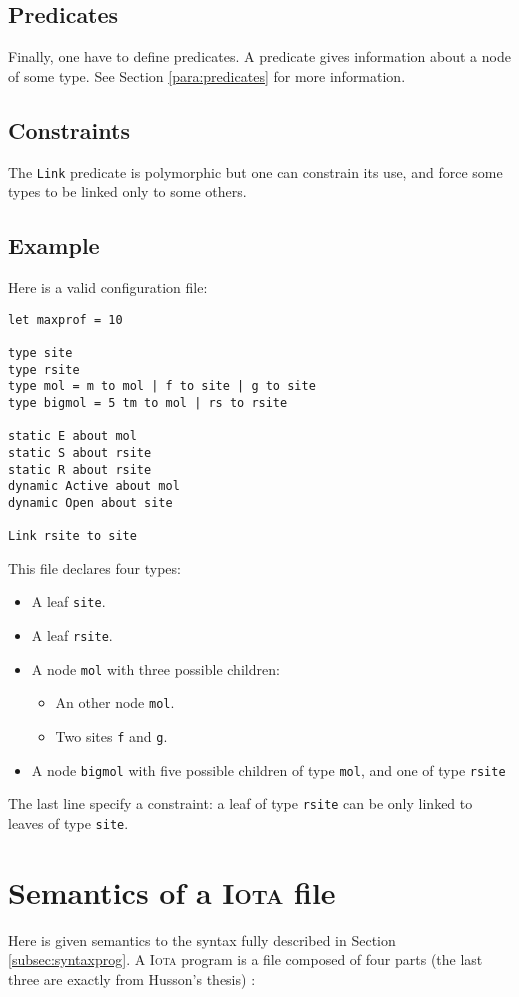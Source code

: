\documentclass[10pt,a4paper]{article}
\newcommand\Iota{\textsc{Iota}}
\newcommand{\ocaml}{\texttt}
\begin{document}
\subsection{Predicates}
\label{subsec:predicates}
Finally, one have to define predicates. A predicate gives information about a node of some type. See Section \ref{para:predicates} for more information.

\subsection{Constraints}
The \ocaml{Link} predicate is polymorphic but one can constrain its use, and force some types to be linked only to some others.

\subsection{Example}
Here is a valid configuration file:
\begin{verbatim}
let maxprof = 10

type site
type rsite
type mol = m to mol | f to site | g to site
type bigmol = 5 tm to mol | rs to rsite

static E about mol
static S about rsite
static R about rsite
dynamic Active about mol
dynamic Open about site

Link rsite to site
\end{verbatim}

This file declares four types:

\begin{itemize}
\item A leaf \ocaml{site}.
\item A leaf \ocaml{rsite}.
\item A node \ocaml{mol} with three possible children:
  \begin{itemize}
  \item An other node \ocaml{mol}.
  \item Two sites \ocaml{f} and \ocaml{g}.
  \end{itemize}
\item A node \ocaml{bigmol} with five possible children of type \ocaml{mol}, and one of type \ocaml{rsite}
\end{itemize}

The last line specify a constraint: a leaf of type \ocaml{rsite} can be only linked to leaves of type \ocaml{site}.

\section{Semantics of a \Iota{} file}
Here is given semantics to the syntax fully described in Section \ref{subsec:syntaxprog}. A \Iota{} program is a file composed of four parts (the last three are exactly from Husson's thesis) :
\end{document}
